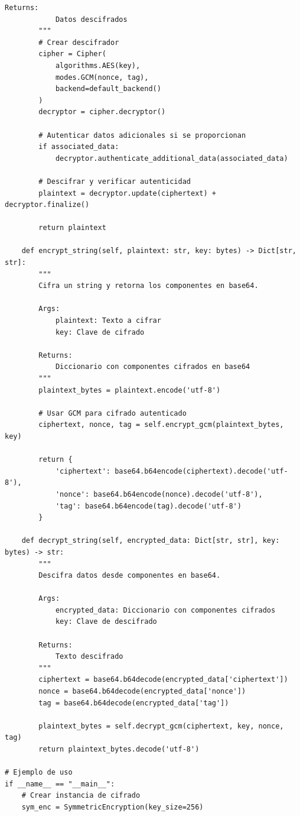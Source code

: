 \documentclass[12pt,a4paper]{article}
\begin{document}
\begin{lstlisting}[caption=Implementación de cifrado simétrico con AES]
        Returns:
            Datos descifrados
        """
        # Crear descifrador
        cipher = Cipher(
            algorithms.AES(key),
            modes.GCM(nonce, tag),
            backend=default_backend()
        )
        decryptor = cipher.decryptor()
        
        # Autenticar datos adicionales si se proporcionan
        if associated_data:
            decryptor.authenticate_additional_data(associated_data)
        
        # Descifrar y verificar autenticidad
        plaintext = decryptor.update(ciphertext) + decryptor.finalize()
        
        return plaintext
    
    def encrypt_string(self, plaintext: str, key: bytes) -> Dict[str, str]:
        """
        Cifra un string y retorna los componentes en base64.
        
        Args:
            plaintext: Texto a cifrar
            key: Clave de cifrado
            
        Returns:
            Diccionario con componentes cifrados en base64
        """
        plaintext_bytes = plaintext.encode('utf-8')
        
        # Usar GCM para cifrado autenticado
        ciphertext, nonce, tag = self.encrypt_gcm(plaintext_bytes, key)
        
        return {
            'ciphertext': base64.b64encode(ciphertext).decode('utf-8'),
            'nonce': base64.b64encode(nonce).decode('utf-8'),
            'tag': base64.b64encode(tag).decode('utf-8')
        }
    
    def decrypt_string(self, encrypted_data: Dict[str, str], key: bytes) -> str:
        """
        Descifra datos desde componentes en base64.
        
        Args:
            encrypted_data: Diccionario con componentes cifrados
            key: Clave de descifrado
            
        Returns:
            Texto descifrado
        """
        ciphertext = base64.b64decode(encrypted_data['ciphertext'])
        nonce = base64.b64decode(encrypted_data['nonce'])
        tag = base64.b64decode(encrypted_data['tag'])
        
        plaintext_bytes = self.decrypt_gcm(ciphertext, key, nonce, tag)
        return plaintext_bytes.decode('utf-8')

# Ejemplo de uso
if __name__ == "__main__":
    # Crear instancia de cifrado
    sym_enc = SymmetricEncryption(key_size=256)
    

\end{lstlisting}
\end{document}
